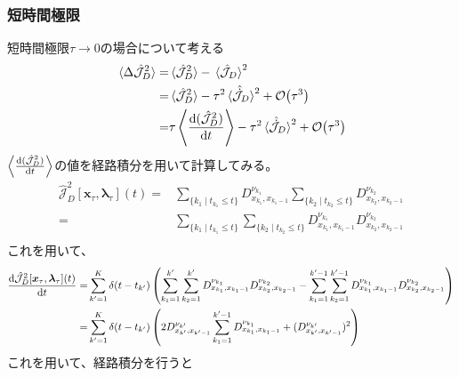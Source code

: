 \documentclass{ltjsarticle}
\begin{document}
\subsubsection{短時間極限}
短時間極限$\tau\to 0$の場合について考える
\begin{align}
  \ev*{\Delta\hat{\mathcal{J}}_D^2}=&\ev*{\hat{\mathcal{J}}_D^2}-\ev*{\hat{\mathcal{J}}_D}^2\\
  =&\ev*{\hat{\mathcal{J}}_D^2}-\tau^2\ev*{\hat{\dot{\mathcal{J}}}_D}^2+\order{\tau^3}\\
  =&\tau\ev{\dv{(\hat{\mathcal{J}}_D^2)}{t}}-\tau^2\ev*{\hat{\dot{\mathcal{J}}}_D}^2+\order{\tau^3}
  \label{eq:fluctuation_relation_pre}\\
\end{align}
$\ev{\dv{(\hat{\mathcal{J}}_D^2)}{t}}$の値を経路積分を用いて計算してみる。\\
\begin{align}
  \hat{\mathcal{J}}_D^2[\bm{x}_\tau,\bm{\lambda}_\tau](t)=&\sum_{\lbrace k_1\mid t_{k_1}\le t\rbrace} D^{\nu_{k_1}}_{x_{k_1},x_{k_1-1}}\sum_{\lbrace k_2\mid t_{k_2}\le t\rbrace} D^{\nu_{k_2}}_{x_{k_2},x_{k_2-1}}\\
  =&\sum_{\lbrace k_1\mid t_{k_1}\le t\rbrace} \sum_{\lbrace k_2\mid t_{k_2}\le t\rbrace} D^{\nu_{k_1}}_{x_{k_1},x_{k_1-1}} D^{\nu_{k_2}}_{x_{k_2},x_{k_2-1}}\\
\end{align}
これを用いて、
\begin{align}
  \dv{\hat{\mathcal{J}}_D^2[\bm{x}_\tau,\bm{\lambda}_\tau](t)}{t}
  =&\sum_{k'=1}^{K}\delta(t-t_{k'})\left(\sum_{k_1=1}^{k'} \sum_{k_2=1}^{k'} D^{\nu_{k_1}}_{x_{k_1},x_{k_1-1}} D^{\nu_{k_2}}_{x_{k_2},x_{k_2-1}}-\sum_{k_1=1}^{k'-1} \sum_{k_2=1}^{k'-1} D^{\nu_{k_1}}_{x_{k_1},x_{k_1-1}} D^{\nu_{k_2}}_{x_{k_2},x_{k_2-1}}\right)\\
  =&\sum_{k'=1}^{K}\delta(t-t_{k'})\left(2D^{\nu_{k'}}_{x_{k'},x_{k'-1}}\sum_{k_1=1}^{k'-1}D^{\nu_{k_1}}_{x_{k_1},x_{k_1-1}}+(D^{\nu_{k'}}_{x_{k'},x_{k'-1}})^2\right)
\end{align}
これを用いて、経路積分を行うと
\end{document}
